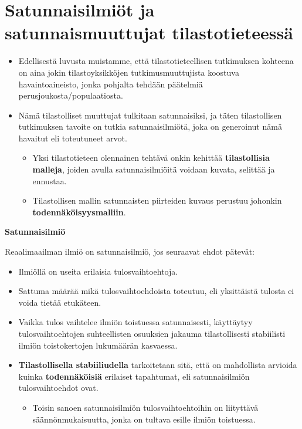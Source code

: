 \documentclass[
]{book}
\providecommand{\tightlist}{%
  \setlength{\itemsep}{0pt}\setlength{\parskip}{0pt}}
\begin{document}
\hypertarget{alaluku41}{%
\section{Satunnaisilmiöt ja satunnaismuuttujat tilastotieteessä}\label{alaluku41}}

\begin{itemize}
\tightlist
\item
  Edellisestä luvusta muistamme, että tilastotieteellisen tutkimuksen kohteena on aina jokin tilastoyksikköjen tutkimusmuuttujista koostuva havaintoaineisto, jonka pohjalta tehdään päätelmiä perusjoukosta/populaatiosta.
\item
  Nämä tilastolliset muuttujat tulkitaan satunnaisiksi, ja täten tilastollisen tutkimuksen tavoite on tutkia satunnaisilmiötä, joka on generoinut nämä havaitut eli toteutuneet arvot.

  \begin{itemize}
  \tightlist
  \item
    Yksi tilastotieteen olennainen tehtävä onkin kehittää \textbf{tilastollisia malleja}, joiden avulla satunnaisilmiöitä voidaan kuvata, selittää ja ennustaa.
  \item
    Tilastollisen mallin satunnaisten piirteiden kuvaus perustuu johonkin \textbf{todennäköisyysmalliin}.
  \end{itemize}
\end{itemize}

\begin{defblock}{}

\textbf{Satunnaisilmiö}

Reaalimaailman ilmiö on satunnaisilmiö, jos seuraavat ehdot pätevät:

\begin{itemize}
\tightlist
\item
  Ilmiöllä on useita erilaisia tulosvaihtoehtoja.
\item
  Sattuma määrää mikä tulosvaihtoehdoista toteutuu, eli yksittäistä tulosta ei voida tietää etukäteen.
\item
  Vaikka tulos vaihtelee ilmiön toistuessa satunnaisesti, käyttäytyy tulosvaihtoehtojen suhteellisten osuuksien jakauma tilastollisesti stabiilisti ilmiön toistokertojen lukumäärän kasvaessa.
\end{itemize}

\end{defblock}

\begin{itemize}
\tightlist
\item
  \textbf{Tilastollisella stabiiliudella} tarkoitetaan sitä, että on mahdollista arvioida kuinka \textbf{todennäköisiä} erilaiset tapahtumat, eli satunnaisilmiön tulosvaihtoehdot ovat.

  \begin{itemize}
  \tightlist
  \item
    Toisin sanoen satunnaisilmiön tulosvaihtoehtoihin on liityttävä säännönmukaisuutta, jonka on tultava esille ilmiön toistuessa.
  \end{itemize}
\end{itemize}
\end{document}
